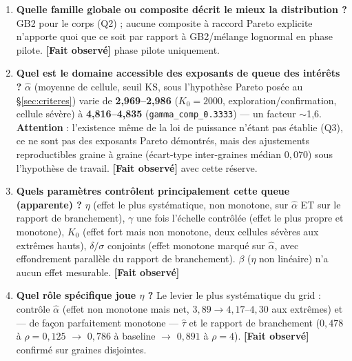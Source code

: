 \documentclass[11pt,a4paper]{article}
\newcommand{\code}[1]{\texttt{#1}}
\newcommand{\fait}{\textbf{[Fait observé]}}
\begin{document}
\begin{enumerate}
\item \textbf{Quelle famille globale ou composite décrit le mieux la
  distribution ?} GB2 pour le corps (Q2) ; aucune composite à raccord
  Pareto explicite n'apporte quoi que ce soit par rapport à GB2/mélange
  lognormal en phase pilote. \fait{} phase pilote uniquement.

\item \textbf{Quel est le domaine accessible des exposants de queue des
  intérêts ?} $\hat\alpha$ (moyenne de cellule, seuil KS, sous
  l'hypothèse Pareto posée au \S\ref{sec:criteres}) varie de
  \textbf{2,969--2,986} ($K_0=2000$, exploration/confirmation, cellule
  sévère) à \textbf{4,816--4,835} (\code{gamma\_comp\_0.3333}) --- un
  facteur $\sim$1,6. \textbf{Attention} : l'existence même de la loi de
  puissance n'étant pas établie (Q3), ce ne sont pas des exposants
  Pareto démontrés, mais des ajustements reproductibles graine à graine
  (écart-type inter-graines médian $0{,}070$) sous l'hypothèse de
  travail. \fait{} avec cette réserve.

\item \textbf{Quels paramètres contrôlent principalement cette queue
  (apparente) ?} $\eta$ (effet le plus systématique, non monotone, sur
  $\hat\alpha$ ET sur le rapport de branchement), $\gamma$ une fois
  l'échelle contrôlée (effet le plus propre et monotone), $K_0$ (effet
  fort mais non monotone, deux cellules sévères aux extrêmes hauts),
  $\delta/\sigma$ conjoints (effet monotone marqué sur $\hat\alpha$,
  avec effondrement parallèle du rapport de branchement). $\beta$
  ($\eta$ non linéaire) n'a aucun effet mesurable. \fait{}

\item \textbf{Quel rôle spécifique joue $\eta$ ?} Le levier le plus
  systématique du grid : contrôle $\hat\alpha$ (effet non monotone mais
  net, $3{,}89\to4{,}17$--$4{,}30$ aux extrêmes) et --- de façon
  parfaitement monotone --- $\hat\tau$ et le rapport de branchement
  ($0{,}478$ à $\rho=0{,}125$ $\to$ $0{,}786$ à baseline $\to$
  $0{,}891$ à $\rho=4$). \fait{} confirmé sur graines disjointes.


\end{enumerate}
\end{document}
